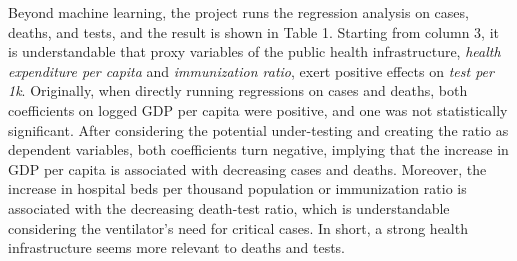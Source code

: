 \documentclass[12pt]{class}
\begin{document}
Beyond machine learning, the project runs the regression analysis on cases, deaths, and tests, and the result is shown in Table 1. Starting from column 3, it is understandable that proxy variables of the public health infrastructure, \textit{health expenditure per capita} and \textit{immunization ratio}, exert positive effects on \textit{test per 1k}. Originally, when directly running regressions on cases and deaths, both coefficients on logged GDP per capita were positive, and one was not statistically significant. After considering the potential under-testing and creating the ratio as dependent variables, both coefficients turn negative, implying that the increase in GDP per capita is associated with decreasing cases and deaths. Moreover, the increase in hospital beds per thousand population or immunization ratio is associated with the decreasing death-test ratio, which is understandable considering the ventilator’s need for critical cases. In short, a strong health infrastructure seems more relevant to deaths and tests. \par
 
\end{document}
